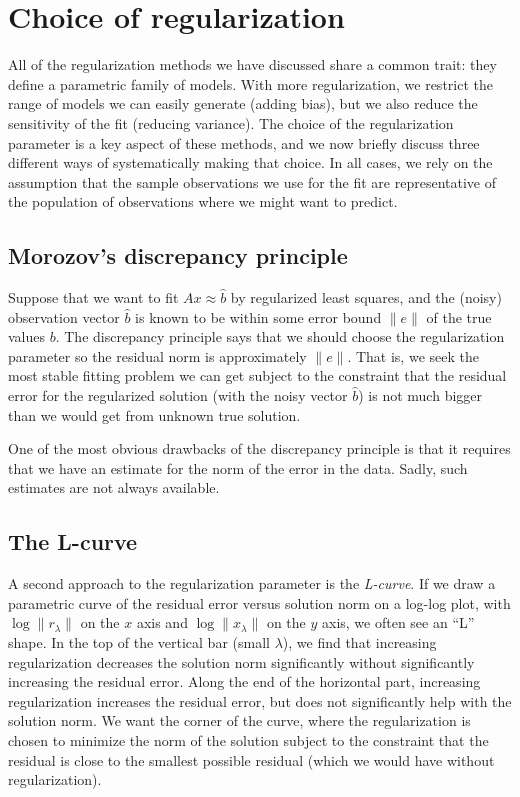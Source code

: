 \documentclass[12pt, leqno]{article} %
\begin{document}

\section{Choice of regularization}

All of the regularization methods we have discussed share a common
trait: they define a parametric family of models.  With more
regularization, we restrict the range of models we can easily generate
(adding bias), but we also reduce the sensitivity of the fit (reducing
variance). The choice of the regularization parameter is a key aspect of
these methods, and we now briefly discuss three different ways of
systematically making that choice.  In all cases, we
rely on the assumption that the sample observations we use for the
fit are representative of the population of observations where we might
want to predict.

\subsection{Morozov's discrepancy principle}

Suppose that we want to fit $Ax \approx \hat{b}$ by regularized least
squares, and the (noisy) observation vector $\hat{b}$ is known to be
within some error bound $\|e\|$ of the true values $b$. The discrepancy
principle says that we should choose the regularization parameter so the
residual norm is approximately $\|e\|$. That is, we seek the most stable
fitting problem we can get subject to the constraint that the residual
error for the regularized solution (with the noisy vector $\hat{b}$) is
not much bigger than we would get from unknown true solution.

One of the most obvious drawbacks of the discrepancy principle is that
it requires that we have an estimate for the norm of the error in the
data.  Sadly, such estimates are not always available.

\subsection{The L-curve}

A second approach to the regularization parameter is the {\em L-curve}.
If we draw a parametric curve of the residual error versus solution norm
on a log-log plot, with $\log \|r_{\lambda}\|$ on the $x$ axis
and $\log \|x_{\lambda}\|$ on the $y$ axis, we often see an ``L'' shape.
In the top of the vertical bar (small $\lambda$), we find that increasing
regularization decreases the solution norm significantly without significantly
increasing the residual error.  Along the end of the horizontal part,
increasing regularization increases the residual error, but does not
significantly help with the solution norm.  We want the corner of the
curve, where the regularization is chosen to minimize the norm of the
solution subject to the constraint that the residual is close to the
smallest possible residual (which we would have without regularization).
\end{document}
